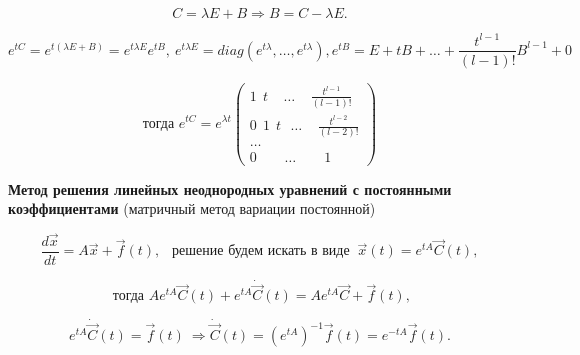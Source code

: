 \[ C = \lambda E + B \Rightarrow B = C - \lambda E. \]

\[ e^{tC} = e^{t(\lambda E + B)} = e^{t\lambda E}e^{tB},\ e^{t\lambda E} = diag(e^{t\lambda}, \dots, e^{t\lambda}), e^{tB} = E + tB + \dots + \frac{t^{l-1}}{(l-1)!}B^{l-1} + 0 \]

\begin{equation*}
	\text{тогда } e^{tC} = e^{\lambda t}
 	\begin{pmatrix}
            1\ \ t\ \ \ \ \  \dots\ \ \ \ \ \frac{t^{l-1}}{(l-1)!} \\
            0\ \ 1\ \ t\ \ \ \dots\ \ \ \ \  \frac{t^{l-2}}{(l-2)!} \\
            \dots \\
            0\ \ \ \ \ \ \ \ \ \dots\ \ \ \ \ \ \ \ \  1
    \end{pmatrix}
\end{equation*}

\textbf{Метод решения линейных неоднородных уравнений с постоянными коэффициентами} (матричный метод вариации постоянной)

\[ \frac{d\overrightarrow{x}}{dt} = A\overrightarrow{x} + \overrightarrow{f}(t),\ \ \text{ решение будем искать в виде } \ \overrightarrow{x}(t) = e^{tA}\overrightarrow{C}(t), \]

\[ \text{ тогда } Ae^{tA}\overrightarrow{C}(t) + e^{tA}\dot{\overrightarrow{C}}(t) = Ae^{tA}\overrightarrow{C} + \overrightarrow{f}(t),\]

\[ e^{tA}\dot{\overrightarrow{C}}(t) = \overrightarrow{f}(t)\ \Rightarrow \dot{\overrightarrow{C}}(t) = (e^{tA})^{-1}\overrightarrow{f}(t) = e^{-tA}\overrightarrow{f}(t). \]

\newpage
